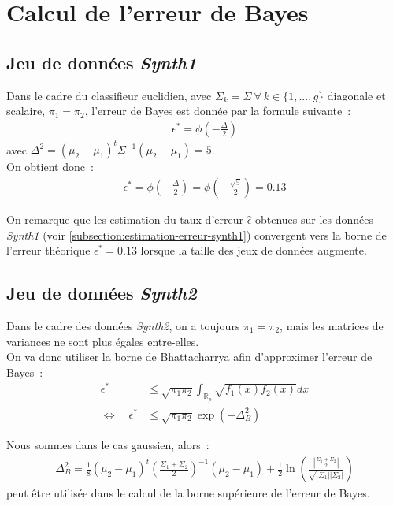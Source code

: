 \documentclass[a4paper,10pt]{report}
\begin{document}
\section{Calcul de l'erreur de Bayes}


\subsection{Jeu de données \textit{Synth1}}

Dans le cadre du classifieur euclidien, avec $\Sigma_k = \Sigma \ \forall \ k \in \{1, ...,  g\}$ diagonale et scalaire, $\pi_{1} = \pi_{2}$, l'erreur de Bayes est donnée par la formule suivante~:
\begin{align*}
	\epsilon^* = \phi \left(-\frac{\Delta}{2}\right)
\end{align*}
avec $\Delta^2 = (\mu_{2} - \mu_{1})^t\Sigma^{-1}(\mu_{2} - \mu_{1}) = 5$.\\


On obtient donc~:
\begin{align*}
\epsilon^* 
= \phi \left(-\frac{\Delta}{2}\right)
= \phi \left(-\frac{\sqrt{5}}{2}\right)
= 0.13
\end{align*}

On remarque que les estimation du taux d'erreur $ \hat{\epsilon}$ obtenues sur les données \textit{Synth1} (voir \autoref{subsection:estimation-erreur-synth1}) convergent vers la borne de l'erreur théorique $\epsilon^* = 0.13$ lorsque la taille des jeux de données augmente.

\subsection{Jeu de données \textit{Synth2}}

Dans le cadre des données \textit{Synth2}, on a toujours $\pi_{1} = \pi_{2}$, mais les matrices de variances ne sont plus égales entre-elles.\\

On va donc utiliser la borne de Bhattacharrya afin d'approximer l'erreur de Bayes~:
\begin{align*}
\epsilon^* &\leq \sqrt{\pi_{1}\pi_{2}} \int_{\mathbb{R}_p} \sqrt{f_1(x)f_2(x)}dx \\
\Leftrightarrow \quad \epsilon^* &\leq \sqrt{\pi_{1}\pi_{2}} \exp(-\Delta_B^2)
\end{align*}

Nous sommes dans le cas gaussien, alors~:
\begin{align*}
\Delta_B^2 = \frac{1}{8}(\mu_{2} - \mu_1)^t \left(\frac{\Sigma_{1} + \Sigma_{2}}{2}\right)^{-1} (\mu_{2} - \mu_1)
	+ \frac{1}{2} \ln \left( \frac{|\frac{\Sigma_{1} + \Sigma_{2}}{2}|}{\sqrt{|\Sigma_1||\Sigma_2|}} \right)
\end{align*}
peut être utilisée dans le calcul de la borne supérieure de l'erreur de Bayes.\\
\end{document}
